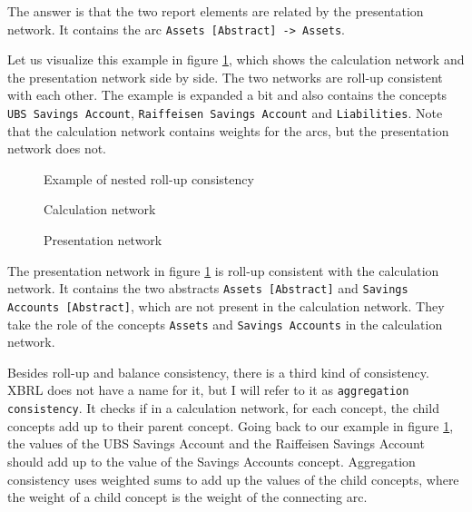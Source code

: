 The answer is that the two report elements are related by the presentation network.
It contains the arc \texttt{Assets [Abstract] -> Assets}.

Let us visualize this example in figure \ref{fig:example_roll_up_consistency}, 
which shows the calculation network and the presentation network side by side.
The two networks are roll-up consistent with each other.
The example is expanded a bit and also contains the concepts \texttt{UBS Savings Account}, 
\texttt{Raiffeisen Savings Account} and \texttt{Liabilities}.
Note that the calculation network contains weights for the arcs, but the presentation network does not.

\begin{figure}[H]
    \caption{Example of nested roll-up consistency}
    \label{fig:example_roll_up_consistency}
    \begin{minipage}{0.8\textwidth}
        \caption{Calculation network}
    \end{minipage}
    \begin{minipage}{0.8\textwidth}
        \caption{Presentation network}
    \end{minipage}
\end{figure}

The presentation network in figure \ref{fig:example_roll_up_consistency} is roll-up consistent with the calculation network.
It contains the two abstracts \texttt{Assets [Abstract]} and \texttt{Savings Accounts [Abstract]}, 
which are not present in the calculation network. 
They take the role of the concepts \texttt{Assets} and \texttt{Savings Accounts} in the calculation network.

Besides roll-up and balance consistency, there is a third kind of consistency. 
XBRL does not have a name for it, but I will refer to it as \texttt{aggregation consistency}.
It checks if in a calculation network, for each concept, the child concepts add up to their parent concept.
Going back to our example in figure \ref{fig:example_roll_up_consistency},
the values of the UBS Savings Account and the Raiffeisen Savings Account should add up to the value of the Savings Accounts concept.
Aggregation consistency uses weighted sums to add up the values of the child concepts, 
where the weight of a child concept is the weight of the connecting arc.

